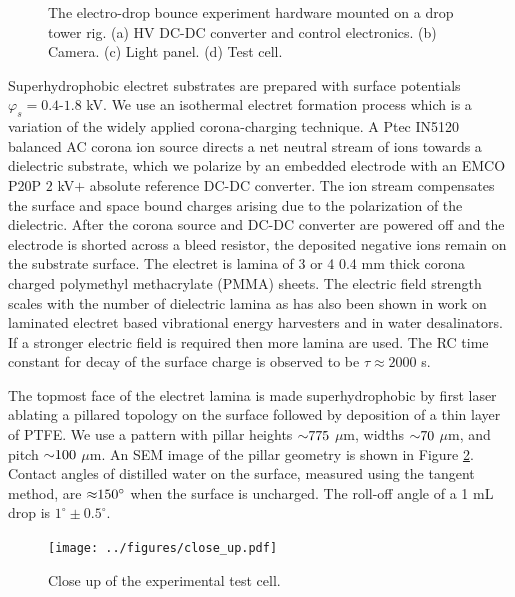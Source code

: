 \documentclass[aip,reprint, floatfix]{revtex4-1}
\begin{document}
\begin{figure}
    \centering
    \fontsize{12pt}{13pt}\selectfont
    \def\svgwidth{\columnwidth}
    \caption{The electro-drop bounce experiment hardware mounted on a drop tower rig. (a) HV DC-DC converter and control electronics. (b) Camera. (c) Light panel. (d) Test cell. \label{fig:rig}}
\end{figure}

Superhydrophobic electret substrates are prepared with surface potentials $\varphi_s = 0.4$-$1.8$ kV. We use an isothermal electret formation process which is a variation of the widely applied corona-charging technique. A Ptec IN5120 balanced AC corona ion source directs a net neutral stream of ions towards a dielectric substrate, which we polarize by an embedded electrode with an EMCO P20P $2$ kV$+$ absolute reference DC-DC converter. The ion stream compensates the surface and space bound charges arising due to the polarization of the dielectric. After the corona source and DC-DC converter are powered off and the electrode is shorted across a bleed resistor, the deposited negative ions remain on the substrate surface. The electret is lamina of 3 or 4 0.4 mm thick corona charged polymethyl methacrylate (PMMA) sheets. The electric field strength scales with the number of dielectric lamina as has also been shown in work on laminated electret based vibrational energy harvesters \cite{wada_stacking_2012} and in water desalinators. \cite{ni_desalination_2005} If a stronger electric field is required then more lamina are used. The RC time constant for decay of the surface charge is observed to be $\tau \approx 2000$ s.

The topmost face of the electret lamina is made superhydrophobic by first laser ablating a pillared topology  on the surface followed by deposition of a thin layer of PTFE. We use a pattern with pillar heights $\sim \hspace{-1mm} 775$ $\mu$m, widths $\sim \hspace{-1mm} 70$ $\mu$m, and pitch $\sim \hspace{-1mm} 100$ $\mu$m. An SEM image of the pillar geometry is shown in Figure \ref{fig:SEM}. Contact angles of distilled water on the surface, measured using the tangent method, are $\approx \hspace{-1mm} 150^{\circ}$ when the surface is uncharged. The roll-off angle of a 1 mL drop is $1^{\circ} \pm 0.5^{\circ}$.

\begin{figure}
    \centering
    \def\svgwidth{\columnwidth}
        \texttt{[image: ../figures/close\_up.pdf]}
    \caption{Close up of the experimental test cell.\label{fig:SEM}}
\end{figure}
\end{document}
